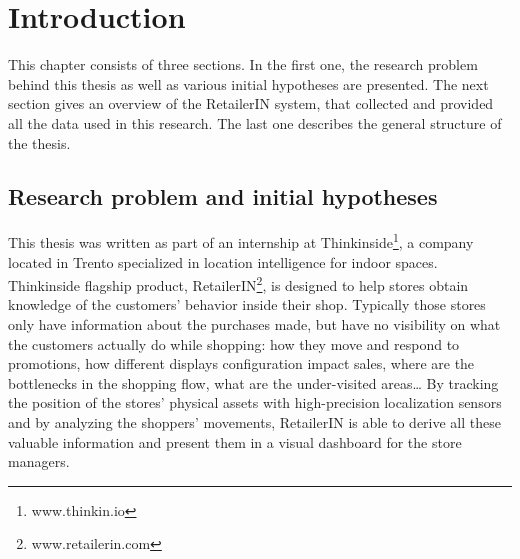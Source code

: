 \chapter{Introduction}
\label{cha:introduction}

This chapter consists of three sections. In the first one, the research problem behind this thesis as well as various initial hypotheses are presented. The next section gives an overview of the RetailerIN system, that collected and provided all the data used in this research. The last one describes the general structure of the thesis.

\section{Research problem and initial hypotheses}
\label{sec:research_problem_and_initial_hypoteses}

This thesis was written as part of an internship at Thinkinside\footnote{www.thinkin.io}, a company located in Trento specialized in location intelligence for indoor spaces. Thinkinside flagship product, RetailerIN\footnote{www.retailerin.com}, is designed to help stores obtain knowledge of the customers’ behavior inside their shop. Typically those stores only have information about the purchases made, but have no visibility on what the customers actually do while shopping: how they move and respond to promotions, how different displays configuration impact sales, where are the bottlenecks in the shopping flow, what are the under-visited areas… By tracking the position of the stores’ physical assets with high-precision localization sensors and by analyzing the shoppers’ movements, RetailerIN is able to derive all these valuable information and present them in a visual dashboard for the store managers.

